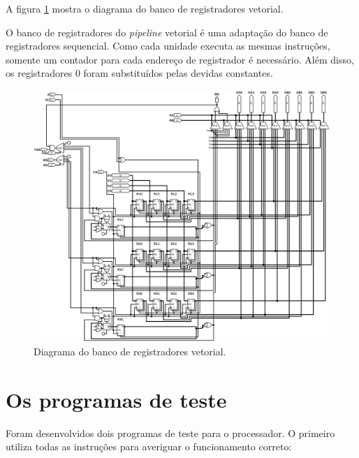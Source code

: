 \documentclass{article}
\begin{document}
A figura \ref{fig-banco} mostra o diagrama do banco de registradores vetorial.

O banco de registradores do \textit{pipeline} vetorial é uma adaptação do banco
de registradores sequencial. Como cada unidade executa as mesmas instruções,
somente um contador para cada endereço de registrador é necessário. Além disso,
os registradores 0 foram substituídos pelas devidas constantes.

\begin{figure}[h]
	\centering
	\includegraphics[width=\textwidth]{register_bank.png}
	\caption{Diagrama do banco de registradores vetorial.}
	\label{fig-banco}
\end{figure}

\section{Os programas de teste}

Foram desenvolvidos dois programas de teste para o processador. O primeiro
utiliza todas as instruções para averiguar o funcionamento correto:
\end{document}
